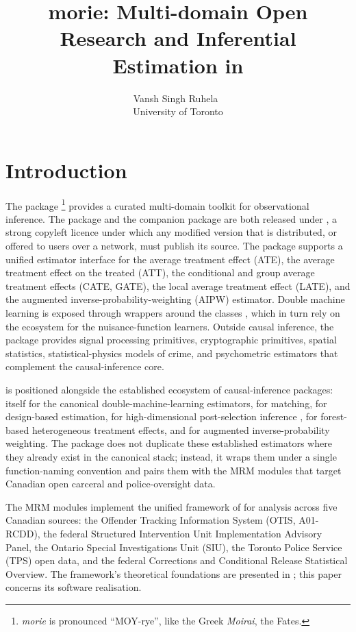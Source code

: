 \documentclass[article,shortnames,nojss]{jss}
\title{morie: Multi-domain Open Research and Inferential Estimation in \proglang{R}}
\author{Vansh Singh Ruhela~\orcidlink{0009-0004-1750-3592}\\University of Toronto}
\newcommand{\OTIS}{\textsf{OTIS}}
\newcommand{\SIU}{\textsf{SIU}}
\newcommand{\TPS}{\textsf{TPS}}
\begin{document}
\sloppy

\section{Introduction}
\label{sec:intro}

The  package \footnote{\textit{morie} is
pronounced ``MOY-rye'', like the Greek \textit{Moirai},
the Fates.} provides a curated
multi-domain toolkit for observational inference. The
 package and the companion  package
\citep{Ruhela2026MoriePy} are both released under
, a strong copyleft licence under which any
modified version that is distributed, or offered to users over a
network, must publish its source.  The package supports a
unified estimator interface for the average treatment effect
(ATE), the average treatment effect on the treated (ATT), the
conditional and group average treatment effects (CATE, GATE), the
local average treatment effect (LATE), and the augmented
inverse-probability-weighting (AIPW) estimator. Double machine
learning is exposed through wrappers around the 
classes \citep{Bach2024DoubleML}, which in turn rely on the
 ecosystem \citep{Lang2019mlr3} for the nuisance-function
learners. Outside causal inference, the package provides signal
processing primitives, cryptographic primitives, spatial statistics,
statistical-physics models of crime, and psychometric estimators
that complement the causal-inference core.

 is positioned alongside the established 
ecosystem of causal-inference packages:  itself
\citep{Bach2024DoubleML} for the canonical double-machine-learning
estimators,  for matching,  for
design-based estimation,  for high-dimensional
post-selection inference \citep{ChernozhukovHansenSpindler2016hdm},
 for forest-based heterogeneous treatment effects, and
 for augmented inverse-probability weighting. The
package does not duplicate these established estimators where they
already exist in the canonical  stack; instead, it
wraps them under a single function-naming convention and pairs
them with the MRM modules that target Canadian open carceral and
police-oversight data.

The MRM modules implement the unified framework of
\citet{Ruhela2026MRM} for analysis across five Canadian sources:
the Offender Tracking Information System (\OTIS, A01-RCDD), the
federal Structured Intervention Unit Implementation Advisory
Panel, the Ontario Special Investigations Unit (\SIU), the Toronto
Police Service (\TPS) open data, and the federal Corrections and
Conditional Release Statistical Overview. The framework's
theoretical foundations are presented in \citet{Ruhela2026MRM};
this paper concerns its  software realisation.
\end{document}

